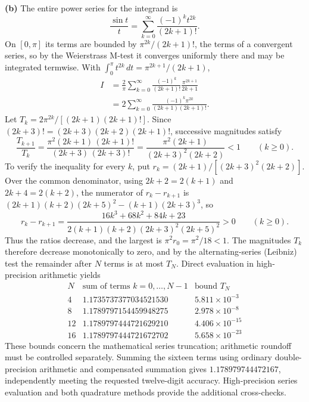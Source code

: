 \textbf{(b)} The entire power series for the integrand is
\[
\frac{\sin t}{t}=\sum_{k=0}^{\infty}
\frac{(-1)^kt^{2k}}{(2k+1)!}.
\]
On $[0,\pi]$ its terms are bounded by $\pi^{2k}/(2k+1)!$, the terms of
a convergent series, so by the Weierstrass M-test it converges
uniformly there and may be integrated termwise. With
$\int_0^\pi t^{2k}\,dt=\pi^{2k+1}/(2k+1)$,
\begin{align*}
I&=\frac2\pi\sum_{k=0}^{\infty}
\frac{(-1)^k}{(2k+1)!}\frac{\pi^{2k+1}}{2k+1}\\
&=\boxed{2\sum_{k=0}^{\infty}
\frac{(-1)^k\pi^{2k}}{(2k+1)(2k+1)!}}.
\end{align*}
Let $T_k=2\pi^{2k}/[(2k+1)(2k+1)!]$. Since
$(2k+3)!=(2k+3)(2k+2)(2k+1)!$, successive magnitudes satisfy
\[
\frac{T_{k+1}}{T_k}
=\frac{\pi^2(2k+1)\,(2k+1)!}{(2k+3)\,(2k+3)!}
=\frac{\pi^2(2k+1)}{(2k+3)^2(2k+2)}<1\qquad(k\ge0).
\]
To verify the inequality for every $k$, put
$r_k=(2k+1)/[(2k+3)^2(2k+2)]$. Over the common denominator, using
$2k+2=2(k+1)$ and $2k+4=2(k+2)$, the numerator of $r_k-r_{k+1}$ is
$(2k+1)(k+2)(2k+5)^2-(k+1)(2k+3)^3$, so
\[
r_k-r_{k+1}
=\frac{16k^3+68k^2+84k+23}
 {2(k+1)(k+2)(2k+3)^2(2k+5)^2}>0\qquad(k\ge0).
\]
Thus the ratios decrease, and the largest is $\pi^2r_0=\pi^2/18<1$.
The magnitudes $T_k$ therefore decrease monotonically to zero, and by
the alternating-series (Leibniz) test the remainder after $N$ terms is
at most $T_N$. Direct evaluation in high-precision arithmetic yields
\[
\begin{array}{r|l|l}
N&\text{sum of terms }k=0,\ldots,N-1&\text{bound }T_N\\\hline
4&1.1735737377034521530&5.811\times10^{-3}\\
8&1.1789797154459948275&2.978\times10^{-8}\\
12&1.1789797444721629210&4.406\times10^{-15}\\
16&1.1789797444721672702&5.658\times10^{-23}
\end{array}
\]
These bounds concern the mathematical series truncation; arithmetic
roundoff must be controlled separately. Summing the sixteen terms using
ordinary double-precision arithmetic and compensated summation gives
$1.178979744472167$, independently meeting the requested twelve-digit
accuracy. High-precision series evaluation and both quadrature methods
provide the additional cross-checks.

